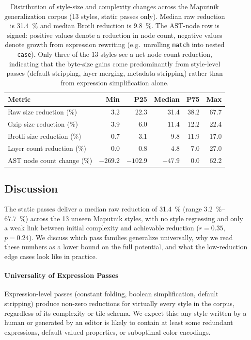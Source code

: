 \begin{table}[htbp]
\centering
\small
\begin{tabular}{l r r r r r}
\toprule
\textbf{Metric} & \textbf{Min} & \textbf{P25} & \textbf{Median} & \textbf{P75} & \textbf{Max} \\
\midrule
Raw size reduction (\%)         &    3.2 &   22.3 &  31.4 & 38.2 & 67.7 \\
Gzip size reduction (\%)        &    3.9 &    6.0 &  11.4 & 12.2 & 22.4 \\
Brotli size reduction (\%)      &    0.7 &    3.1 &   9.8 & 11.9 & 17.0 \\
Layer count reduction (\%)      &    0.0 &    0.8 &   4.8 &  7.0 & 27.0 \\
\ac{AST} node count change (\%) & $-269.2$ & $-102.9$ & $-47.9$ & 0.0 & 62.2 \\
\bottomrule
\end{tabular}
\caption{
Distribution of style-size and complexity changes across the Maputnik generalization corpus (13 styles, static passes only).
Median raw reduction is \qty{31.4}{\percent} and median Brotli reduction is \qty{9.8}{\percent}.
The \ac{AST}-node row is signed: positive values denote a reduction in node count, negative values denote growth from expression rewriting (e.g.\ unrolling \texttt{match} into nested \texttt{case}).
Only three of the 13 styles see a net node-count reduction, indicating that the byte-size gains come predominantly from style-level passes (default stripping, layer merging, metadata stripping) rather than from expression simplification alone.}
\label{tab:cross_style_summary}
\end{table}

\subsection{Discussion}\label{sub:cross_discussion}

The static passes deliver a median raw reduction of \qty{31.4}{\percent} (range \qtyrange{3.2}{67.7}{\percent}) across the 13 unseen Maputnik styles, with no style regressing and only a weak link between initial complexity and achievable reduction ($r = 0.35$, $p = 0.24$).
We discuss which pass families generalize universally, why we read these numbers as a lower bound on the full potential, and what the low-reduction edge cases look like in practice.

\paragraph{Universality of Expression Passes}
Expression-level passes (constant folding, boolean simplification, default stripping) produce non-zero reductions for virtually every style in the corpus, regardless of its complexity or tile schema.
We expect this: any style written by a human or generated by an editor is likely to contain at least some redundant expressions, default-valued properties, or suboptimal color encodings.


